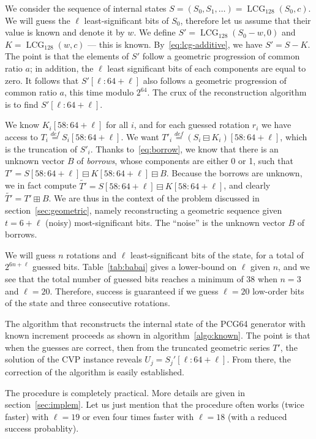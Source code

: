 \documentclass[submission,svgnames,journal=tosc]{iacrtrans}
\DeclareMathOperator{\LCG}{LCG}
\begin{document}
We consider the sequence of internal states
$S = (S_0, S_1, \dots) = \LCG_{128}(S_0, c)$. We will guess the $\ell$
least-significant bits of $S_0$, therefore let us assume that their value is
known and denote it by $w$. We define $S' = \LCG_{128}(S_0 - w, 0)$ and
$K = \LCG_{128}(w, c)$ --- this is known. By~\eqref{eq:lcg-additive}, we have
$S' = S - K$. The point is that the elements of $S'$ follow a geometric
progression of common ratio $a$; in addition, the $\ell$ least significant bits
of each components are equal to zero. It follows that $S'[\ell:64+\ell]$ also
follows a geometric progression of common ratio $a$, this time modulo
$2^{64}$. The crux of the reconstruction algorithm is to find
$S'[\ell:64+\ell]$.

We know $K_i[58:64+\ell]$ for all $i$, and for each guessed rotation $r_i$ we
have access to $T_i \stackrel{def}{=} S_i[58:64+\ell]$.  We want
$T'_i \stackrel{def}{=} (S_i \boxminus K_i)[58:64+\ell]$, which is the
truncation of $S'_i$. Thanks to~\eqref{eq:borrow}, we know that there is an
unknown vector $B$ of \emph{borrows}, whose components are either 0 or 1, such
that $T' = S[58:64+\ell] \boxminus K[58:64+\ell] \boxminus B$. Because the
borrows are unknown, we in fact compute
$\widetilde{T'} = S[58:64+\ell] \boxminus K[58:64+\ell]$, and clearly
$\widetilde{T'} = T' \boxplus B$. We are thus in the context of the problem
discussed in section~\ref{sec:geometric}, namely reconstructing a geometric
sequence given $t = 6+\ell$ (noisy) most-significant bits. The ``noise'' is the
unknown vector $B$ of borrows. %

We will guess $n$ rotations and $\ell$ least-significant bits of the state, for
a total of $2^{6n + \ell}$ guessed bits. Table~\ref{tab:babai} gives a
lower-bound on $\ell$ given $n$, and we see that the total number of guessed
bits reaches a minimum of $38$ when $n=3$ and $\ell=20$. Therefore, success is
guaranteed if we guess $\ell = 20$ low-order bits of the state and three
consecutive rotations.

The algorithm that reconstructs the internal state of the \textsf{PCG64}
generator with known increment proceeds as shown in
algorithm~\ref{algo:known}. The point is that when the guesses are correct, then
from the truncated geometric series $T'$, the solution of the CVP instance
reveals $U_j = S_j'[\ell:64+\ell]$. From there, the correction of the algorithm
is easily established.

The procedure is completely practical. More details are given in
section~\ref{sec:implem}. Let us just mention that the procedure often works
(twice faster) with $\ell=19$ or even four times faster with $\ell = 18$ (with a
reduced success probablity).
\end{document}
